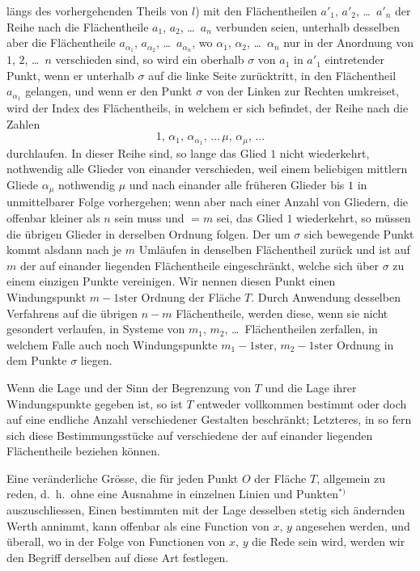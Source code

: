 \documentclass{article}
\begin{document}
längs des vorhergehenden Theils von $l$) mit den Flächentheilen $a'_{1}$, $a'_{2}$, \dots\ $a'_{n}$ der Reihe nach die Flächentheile $a_{1}$, $a_{2}$, \dots\ $a_{n}$ verbunden seien, unterhalb desselben aber die Flächentheile $a_{\alpha_1}$, $a_{\alpha_2}$, \dots\ $a_{\alpha_n}$, wo $\alpha_1$, $\alpha_2$, \dots\ $\alpha_n$ nur in der Anordnung von $1$, $2$, \dots\ $n$ verschieden sind, so wird ein oberhalb $\sigma$ von $a_1$ in $a'_1$ eintretender Punkt, wenn er unterhalb $\sigma$ auf die linke Seite zurücktritt, in den Flächentheil $a_{\alpha_1}$ gelangen, und wenn er den Punkt $\sigma$ von der Linken zur Rechten umkreiset, wird der Index des Flächentheils, in welchem er sich befindet, der Reihe nach die Zahlen
\[
1, \, \alpha_1, \, \alpha_{\alpha_1}, \, \dots \, \mu, \, \alpha_\mu, \, \dots
\]
durchlaufen. In dieser Reihe sind, so lange das Glied $1$ nicht wiederkehrt, nothwendig alle Glieder von einander verschieden, weil einem beliebigen mittlern Gliede $\alpha_\mu$ nothwendig $\mu$ und nach einander alle früheren Glieder bis $1$ in unmittelbarer Folge vorhergehen; wenn aber nach einer Anzahl von Gliedern, die offenbar kleiner als $n$ sein muss und $= m$ sei, das Glied $1$ wiederkehrt, so müssen die übrigen Glieder in derselben Ordnung folgen. Der um $\sigma$ sich bewegende Punkt kommt alsdann nach je $m$ Umläufen in denselben Flächentheil zurück und ist auf $m$ der auf einander liegenden Flächentheile eingeschränkt, welche sich über $\sigma$ zu einem einzigen Punkte vereinigen. Wir nennen diesen Punkt einen Windungspunkt $m-1\text{ster}$ Ordnung der Fläche $T$. Durch Anwendung desselben Verfahrens auf die übrigen $n-m$ Flächentheile, werden diese, wenn sie nicht gesondert verlaufen, in Systeme von $m_1$, $m_2$, \dots\ Flächentheilen zerfallen, in welchem Falle auch noch Windungspunkte $m_1-1\text{ster}$, $m_2-1\text{ster}$ Ordnung in dem Punkte $\sigma$ liegen.

Wenn die Lage und der Sinn der Begrenzung von $T$ und die Lage ihrer Windungspunkte gegeben ist, so ist $T$ entweder vollkommen bestimmt oder doch auf eine endliche Anzahl verschiedener Gestalten beschränkt; Letzteres, in so fern sich diese Bestimmungsstücke auf verschiedene der auf einander liegenden Flächentheile beziehen können.

Eine veränderliche Grösse, die für jeden Punkt $O$ der Fläche $T$, allgemein zu reden, d.\ h.\ ohne eine Ausnahme in einzelnen Linien und Punkten${}^{*)}$ auszuschliessen, Einen bestimmten mit der Lage desselben stetig sich ändernden Werth annimmt, kann offenbar als eine Function von $x$, $y$ angesehen werden, und überall, wo in der Folge von Functionen von $x$, $y$ die Rede sein wird, werden wir den Begriff derselben auf diese Art festlegen.
\end{document}
